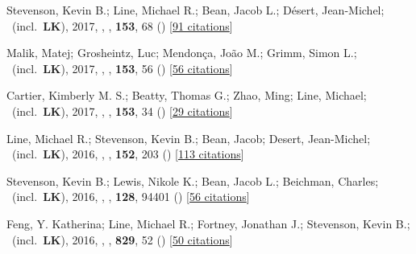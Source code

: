 \item[{\color{numcolor}\scriptsize13}] Stevenson, Kevin B.; Line, Michael R.; Bean, Jacob L.; D{\'e}sert, Jean-Michel; \etal\ (incl.\ \textbf{LK}), 2017, , \aj, \textbf{153}, 68 () [\href{https://ui.adsabs.harvard.edu/abs/2017AJ....153...68S}{91 citations}]

\item[{\color{numcolor}\scriptsize12}] Malik, Matej; Grosheintz, Luc; Mendon{\c{c}}a, Jo{\~a}o M.; Grimm, Simon L.; \etal\ (incl.\ \textbf{LK}), 2017, , \aj, \textbf{153}, 56 () [\href{https://ui.adsabs.harvard.edu/abs/2017AJ....153...56M}{56 citations}]

\item[{\color{numcolor}\scriptsize11}] Cartier, Kimberly M. S.; Beatty, Thomas G.; Zhao, Ming; Line, Michael; \etal\ (incl.\ \textbf{LK}), 2017, , \aj, \textbf{153}, 34 () [\href{https://ui.adsabs.harvard.edu/abs/2017AJ....153...34C}{29 citations}]

\item[{\color{numcolor}\scriptsize10}] Line, Michael R.; Stevenson, Kevin B.; Bean, Jacob; Desert, Jean-Michel; \etal\ (incl.\ \textbf{LK}), 2016, , \aj, \textbf{152}, 203 () [\href{https://ui.adsabs.harvard.edu/abs/2016AJ....152..203L}{113 citations}]

\item[{\color{numcolor}\scriptsize9}] Stevenson, Kevin B.; Lewis, Nikole K.; Bean, Jacob L.; Beichman, Charles; \etal\ (incl.\ \textbf{LK}), 2016, , \pasp, \textbf{128}, 94401 () [\href{https://ui.adsabs.harvard.edu/abs/2016PASP..128i4401S}{56 citations}]

\item[{\color{numcolor}\scriptsize8}] Feng, Y. Katherina; Line, Michael R.; Fortney, Jonathan J.; Stevenson, Kevin B.; \etal\ (incl.\ \textbf{LK}), 2016, , \apj, \textbf{829}, 52 () [\href{https://ui.adsabs.harvard.edu/abs/2016ApJ...829...52F}{50 citations}]

